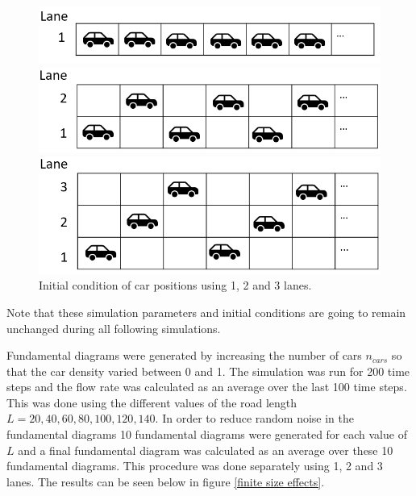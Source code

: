 \documentclass[a4paper,12pt]{article}
\begin{document}
\begin{figure}[H]
    \centering
    \begin{minipage}{1\textwidth}
        \centering
        \includegraphics[scale=0.5]{Images/ic 1 lane.png}
    \end{minipage}

    \centering
    \begin{minipage}{1\textwidth}
        \centering
        \includegraphics[scale=0.5]{Images/ic 2 lanes.png}
    \end{minipage}

    \centering
    \begin{minipage}{1\textwidth}
        \centering
        \includegraphics[scale=0.5]{Images/ic 3 lanes.png}
    \end{minipage}%
    \caption{Initial condition of car positions using 1, 2 and 3 lanes.}
    \label{initial conditions}
\end{figure}

Note that these simulation parameters and initial conditions are going to remain unchanged during all following simulations.

Fundamental diagrams were generated by increasing the number of cars $n_{cars}$ so that the car density varied between 0 and 1. 
The simulation was run for 200 time steps and the flow rate was calculated as an average over the last 100 time steps.
This was done using the different values of the road length $L=20, 40, 60, 80, 100, 120, 140$. In order to reduce random noise in the fundamental diagrams
10 fundamental diagrams were generated for each value of $L$ and a final fundamental diagram was calculated as an average over these 10 fundamental diagrams.
This procedure was done separately using 1, 2 and 3 lanes.
The results can be seen below in figure \ref*{finite size effects}.
\end{document}
